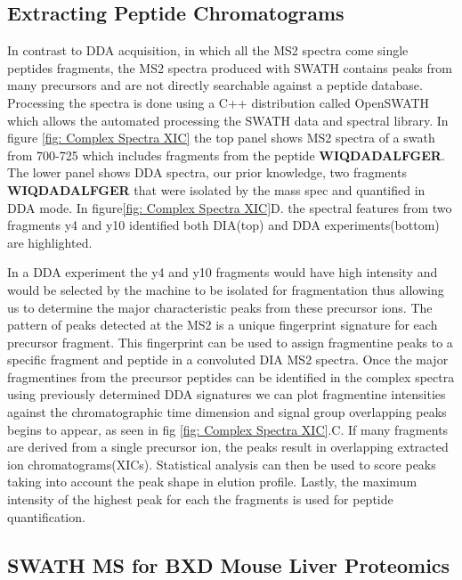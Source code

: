 \documentclass[a4paper,11pt,twoside]{book}
\begin{document}
	\subsection{Extracting Peptide Chromatograms}
	
	In contrast to DDA acquisition, in which all the MS2 spectra come single peptides fragments, the MS2 spectra produced with SWATH contains peaks from many precursors and are not directly searchable against a peptide database. Processing the spectra is done using a C++ distribution called OpenSWATH which allows the automated processing the SWATH data and spectral library\citep{Rost2014OpenSWATHData}. In figure \ref{fig: Complex Spectra XIC} the top panel shows MS2 spectra of a swath from 700-725 which includes fragments from the peptide \textbf{WIQDADALFGER}. The lower panel shows DDA spectra, our prior knowledge, two fragments \textbf{WIQDADALFGER} that were isolated by the mass spec and quantified in DDA mode. In figure\ref{fig: Complex Spectra XIC}D. the spectral features from two fragments y4 and y10 identified both DIA(top) and DDA experiments(bottom) are highlighted. 
	
	In a DDA experiment the y4 and y10 fragments would have high intensity and would be selected by the machine to be isolated for fragmentation thus allowing us to determine the major characteristic peaks from these precursor ions. The pattern of peaks detected at the MS2 is a unique fingerprint signature for each precursor fragment\citep{Gillet2012TargetedAnalysis}. This fingerprint can be used to assign fragmentine peaks to a specific fragment and peptide in a convoluted DIA MS2 spectra. Once the major fragmentines from the precursor peptides can be identified in the complex spectra using previously determined DDA signatures we can plot fragmentine intensities against the chromatographic time dimension and signal group overlapping peaks begins to appear, as seen in fig \ref{fig: Complex Spectra XIC}.C. If many fragments are derived from a single precursor ion, the peaks result in overlapping extracted ion chromatograms(XICs). Statistical analysis can then be used to score peaks taking into account the peak shape in elution profile. Lastly, the  maximum intensity of the highest peak for each the fragments is used for peptide quantification. 
	
	\subsection{SWATH MS for BXD Mouse Liver Proteomics}
	
\end{document}
